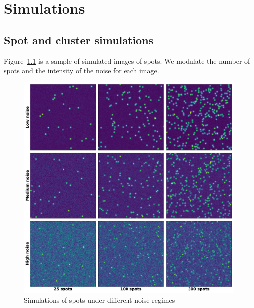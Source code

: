 
\graphicspath{{../../figures/appendix/}}

\chapter{Simulations}
\label{ch:appendix_simulation}

\newpage

\section{Spot and cluster simulations}
\label{sec:appendix_simulations_spots}

\vfill

\noindent
Figure~\ref{fig:spots_mosaic} is a sample of simulated images of spots.
We modulate the number of spots and the intensity of the noise for each image.

\vfill

\begin{figure}[h]
    \centering
    \includegraphics[width=\textwidth]{figures/appendix/spots_mosaic}
    \caption[Spot simulations under different noise regimes]{Simulations of spots under different noise regimes}
    \label{fig:spots_mosaic}
\end{figure}

